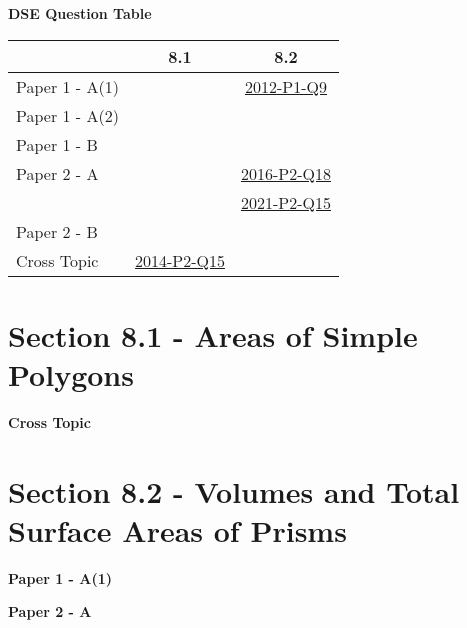 \documentclass[12pt, a4paper]{article}
\begin{document}
\begin{absolutelynopagebreak}
\begin{center}
\textbf{DSE Question Table}
\end{center}
\begin{center}
\begin{tabular}{|l|c|c|}
\hline
        & 8.1 & 8.2 \\\hline
\hline
Paper 1 - A(1)&  & \hyperref[DSE2012-CoreP1-Q09]{2012-P1-Q9} \\
\hline
Paper 1 - A(2)&  &  \\
\hline
Paper 1 - B&  &  \\
\hline
\hline
Paper 2 - A&  & \hyperref[DSE2016-CoreP2-Q18]{2016-P2-Q18} \\
&  & \hyperref[DSE2021-CoreP2-Q15]{2021-P2-Q15} \\
\hline
Paper 2 - B&  &  \\
\hline
\hline
Cross Topic& \hyperref[DSE2014-CoreP2-Q15]{2014-P2-Q15} &  \\
\hline
\end{tabular}
\end{center}
\end{absolutelynopagebreak}




\section*{Section 8.1 - Areas of Simple Polygons}\label{section:1-8-1}

\textbf{Cross Topic}
\begin{enumx}[label=\arabic*.,start=1]
\item {}\label{DSE2014-CoreP2-Q15} 
\end{enumx}




\section*{Section 8.2 - Volumes and Total Surface Areas of Prisms}\label{section:1-8-2}

\textbf{Paper 1 - A(1)}
\begin{enumx}[label=\arabic*.,start=2]
\item {}\label{DSE2012-CoreP1-Q09} 
\end{enumx}
\textbf{Paper 2 - A}
\begin{enumx}[label=\arabic*.,start=3]
\item {}\label{DSE2016-CoreP2-Q18} 
\item {}\label{DSE2021-CoreP2-Q15} 
\end{enumx}
\end{document}
